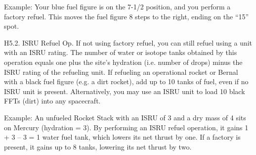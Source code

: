 \documentclass[a4paper]{book}
\begin{document}
Example: Your blue fuel figure is on the 7-1/2 position, and you perform a factory refuel. This moves the fuel figure 8 steps to the right, ending on the “15” spot.

H5.2. ISRU Refuel Op. If not using factory refuel, you can still refuel using a unit with an ISRU rating. The number of water or isotope tanks obtained by this operation equals one plus the site’s hydration (i.e. number of drops) minus the ISRU rating of the refueling unit. If refueling an operational rocket or Bernal with a black fuel figure (e.g. a dirt rocket), add up to 10 tanks of fuel, even if no ISRU unit is present. Alternatively, you may use an ISRU unit to load 10 black FFTs (dirt) into any spacecraft. 

Example: An unfueled Rocket Stack with an ISRU of 3 and a dry mass of 4 sits on Mercury (hydration = 3). By performing an ISRU refuel operation, it gains 1 + 3 – 3 = 1 water fuel tank, which lowers its net thrust by one. If a factory is present, it gains up to 8 tanks, lowering its net thrust by two.
\end{document}
